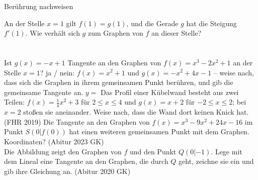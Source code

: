 \setcounter{aufgabe}{12}

\begin{aufgabe}{Berührung nachweisen}
\begin{teile}
\teil An der Stelle $x = 1$ gilt $f(1) = g(1)$, und die Gerade $g$ hat die Steigung $f'(1)$. Wie verhält sich $g$ zum Graphen von $f$ an dieser Stelle? \\  \\  \\ 
\teil Ist $g(x) = -x + 1$ Tangente an den Graphen von $f(x) = x^3 - 2x^2 + 1$ an der Stelle $x = 1$? ja / nein: \leerfeld
\teil $f(x) = x^2 + 1$ und $g(x) = -x^2 + 4x - 1$ – weise nach, dass sich die Graphen in ihrem gemeinsamen Punkt berühren, und gib die gemeinsame Tangente an. $y =$ \leerfeld
\teil Das Profil einer Kübelwand besteht aus zwei Teilen: $f(x) = \frac{1}{4}x^2 + 3$ für $2 \le x \le 4$ und $g(x) = x + 2$ für $-2 \le x \le 2$; bei $x = 2$ stoßen sie aneinander. Weise nach, dass die Wand dort keinen Knick hat. \hfill (FHR 2019)
\teil Die Tangente an den Graphen von $f(x) = x^3 - 9x^2 + 24x - 16$ im Punkt $S(0 | f(0))$ hat einen weiteren gemeinsamen Punkt mit dem Graphen. Koordinaten? \hfill (Abitur 2023 GK) \\ \leerfeld
\teil Die Abbildung zeigt den Graphen von $f$ und den Punkt $Q(0 | -1)$. Lege mit dem Lineal eine Tangente an den Graphen, die durch $Q$ geht, zeichne sie ein und gib ihre Gleichung an. \hfill (Abitur 2020 GK) \\


\end{teile}
\end{aufgabe}

